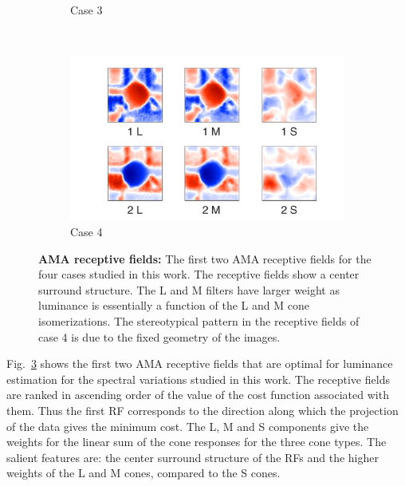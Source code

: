 \documentclass{jov}
\begin{document}
\begin{figure}
\begin{subfigure}{0.21 \textwidth}
	\caption{Case 3}
	\label{fig:case3Filter}
    \end{subfigure}
    ~ ~ ~
        \begin{subfigure}{0.21 \textwidth}
	\includegraphics[width=\textwidth]{../Figures/Figure13/Figure13_d.pdf}
	\caption{Case 4}
	\label{fig:case4Filter}
    \end{subfigure}
\caption{{\bf AMA receptive fields:} The first two AMA receptive fields for the four cases studied in this work. The receptive fields show a center surround structure. The L and M filters have larger weight as luminance is essentially a function of the L and M cone isomerizations. The stereotypical pattern in the receptive fields of case 4 is due to the fixed geometry of the images.}
 \label{fig:AMAFilters}
\end{figure}

Fig.~\ref{fig:AMAFilters} shows the first two AMA receptive fields that are optimal for luminance estimation for the spectral variations studied in this work. The receptive fields are ranked in ascending order of the value of the cost function associated with them. Thus the first RF corresponds to the direction along which the projection of the data gives the minimum cost. The L, M and S components give the weights for the linear sum of the cone responses for the three cone types. The salient features are: the center surround structure of the RFs and the higher weights of the L and M cones, compared to the S cones. 
\end{document}
